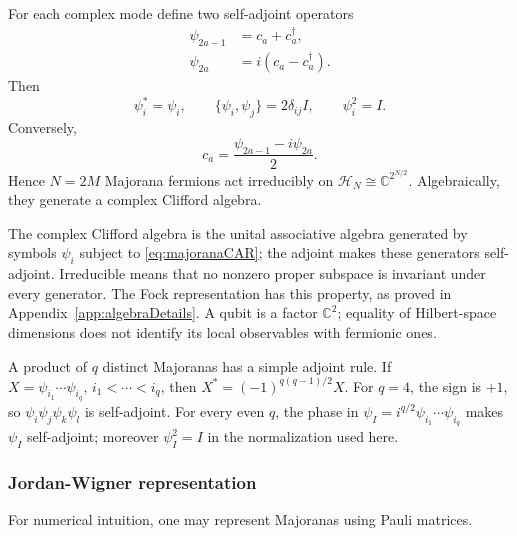\documentclass[11pt]{article}
\numberwithin{equation}{section}
\theoremstyle{exposition}
\theoremstyle{result}
\newcommand{\C}{\mathbb C}
\newcommand{\cH}{\mathcal H}
\begin{document}
For each complex mode define two self-adjoint operators
\begin{align*}
\psi_{2a-1}&=c_a+c_a^\dagger,\\
\psi_{2a}&=i(c_a-c_a^\dagger).
\end{align*}
Then
\begin{equation}
\psi_i^*=\psi_i,
\qquad
\{\psi_i,\psi_j\}=2\delta_{ij}I,
\qquad
\psi_i^2=I.
\label{eq:majoranaCAR}
\end{equation}
Conversely,
\begin{equation*}
c_a=\frac{\psi_{2a-1}-i\psi_{2a}}2.
\end{equation*}
Hence $N=2M$ Majorana fermions act irreducibly on $\cH_N\cong\C^{2^{N/2}}$. Algebraically, they generate a complex Clifford algebra.


The complex Clifford algebra is the unital associative algebra generated by symbols $\psi_i$ subject to \eqref{eq:majoranaCAR}; the adjoint makes these generators self-adjoint. Irreducible means that no nonzero proper subspace is invariant under every generator. The Fock representation has this property, as proved in Appendix~\ref{app:algebraDetails}. A qubit is a factor $\C^2$; equality of Hilbert-space dimensions does not identify its local observables with fermionic ones.

A product of $q$ distinct Majoranas has a simple adjoint rule. If $X=\psi_{i_1}\cdots\psi_{i_q}, \, i_1<\cdots<i_q$, then $X^*=(-1)^{q(q-1)/2}X$. For $q=4$, the sign is $+1$, so $\psi_i\psi_j\psi_k\psi_l$ is self-adjoint. For every even $q$, the phase in $\psi_I=i^{q/2}\psi_{i_1}\cdots\psi_{i_q}$ makes $\psi_I$ self-adjoint; moreover $\psi_I^2=I$ in the normalization used here.

\subsubsection{Jordan-Wigner representation}

For numerical intuition, one may represent Majoranas using Pauli matrices.
\end{document}
